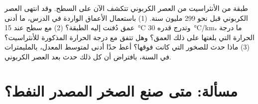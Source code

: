\begin{exercise}[$\star\star\star$]\label{exo:g11:fossil-fuel-geology:15}
طبقة من الأنثراسيت من العصر الكربوني تتكشف الآن على السطح. وقد
انتهى العصر الكربوني قبل نحو 299 مليون سنة. (1) باستعمال الأعماق الواردة
في الدرس، ما أدنى عمق دُفنت إليه الطبقة؟ (2) مع سطح عند
\qty{15}{\degreeCelsius} وتدرج قدره \qty{30}{\degreeCelsius/km}،
ما درجة الحرارة التي بلغتها على ذلك العمق؟ وهل تتفق مع
درجة الحرارة المذكورة للأنثراسيت؟ (3) ماذا حدث للصخور التي
كانت فوقها؟ أعط حدًا أدنى لمتوسط المعدل، بالمليمترات في
السنة، بافتراض أن كل ذلك حدث بعد العصر الكربوني.
\end{exercise}

\section{مسألة: متى صنع الصخر المصدر النفط؟}

